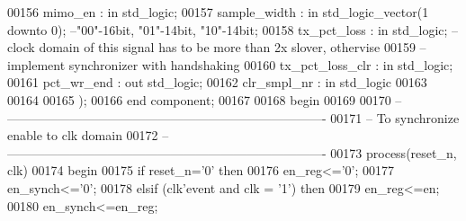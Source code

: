 \begin{DoxyCode}
00156         mimo_en         : \textcolor{keywordflow}{in} \textcolor{comment}{std\_logic};
00157         sample_width    : \textcolor{keywordflow}{in} \textcolor{comment}{std\_logic\_vector}(\textcolor{vhdllogic}{}\textcolor{vhdllogic}{1} \textcolor{keywordflow}{downto} \textcolor{vhdllogic}{}\textcolor{vhdllogic}{0}); \textcolor{keyword}{--"00"-16bit, "01"-14bit, "10"-14bit;}
00158         tx_pct_loss     : \textcolor{keywordflow}{in} \textcolor{comment}{std\_logic}; \textcolor{keyword}{-- clock domain of this signal has to be more than 2x slover,
       othervise }
00159 \textcolor{keyword}{                                       --implement synchronizer with handshaking}
00160         tx_pct_loss_clr : \textcolor{keywordflow}{in} \textcolor{comment}{std\_logic};
00161           pct_wr_end        : \textcolor{keywordflow}{out} \textcolor{comment}{std\_logic};
00162           clr_smpl_nr       : \textcolor{keywordflow}{in} \textcolor{comment}{std\_logic}
00163         
00164         
00165         );
00166 \textcolor{keywordflow}{end} \textcolor{keywordflow}{component};
00167 
00168 \textcolor{vhdlkeyword}{begin}
00169 
00170 \textcolor{keyword}{-- ----------------------------------------------------------------------------}
00171 \textcolor{keyword}{-- To synchronize enable to clk domain}
00172 \textcolor{keyword}{-- ----------------------------------------------------------------------------}
00173   \textcolor{keywordflow}{process}(reset_n, clk)
00174 \textcolor{vhdlkeyword}{    begin}
00175       \textcolor{keywordflow}{if} \textcolor{vhdlchar}{reset_n}\textcolor{vhdlchar}{=}\textcolor{vhdlchar}{'}\textcolor{vhdllogic}{}\textcolor{vhdllogic}{0}\textcolor{vhdlchar}{'} \textcolor{keywordflow}{then}
00176         \textcolor{vhdlchar}{en_reg}\textcolor{vhdlchar}{<=}\textcolor{vhdlchar}{'}\textcolor{vhdllogic}{}\textcolor{vhdllogic}{0}\textcolor{vhdlchar}{'};
00177             \textcolor{vhdlchar}{en_synch}\textcolor{vhdlchar}{<=}\textcolor{vhdlchar}{'}\textcolor{vhdllogic}{}\textcolor{vhdllogic}{0}\textcolor{vhdlchar}{'}; 
00178       \textcolor{keywordflow}{elsif} \textcolor{vhdlchar}{(}\textcolor{vhdlchar}{clk}\textcolor{vhdlchar}{'}\textcolor{vhdlkeyword}{event} \textcolor{keywordflow}{and} \textcolor{vhdlchar}{clk} \textcolor{vhdlchar}{=} \textcolor{vhdlchar}{'}\textcolor{vhdllogic}{}\textcolor{vhdllogic}{1}\textcolor{vhdlchar}{'}\textcolor{vhdlchar}{)} \textcolor{keywordflow}{then}
00179         \textcolor{vhdlchar}{en_reg}\textcolor{vhdlchar}{<=}\textcolor{vhdlchar}{en};
00180             \textcolor{vhdlchar}{en_synch}\textcolor{vhdlchar}{<=}\textcolor{vhdlchar}{en_reg}; 

\end{DoxyCode}

